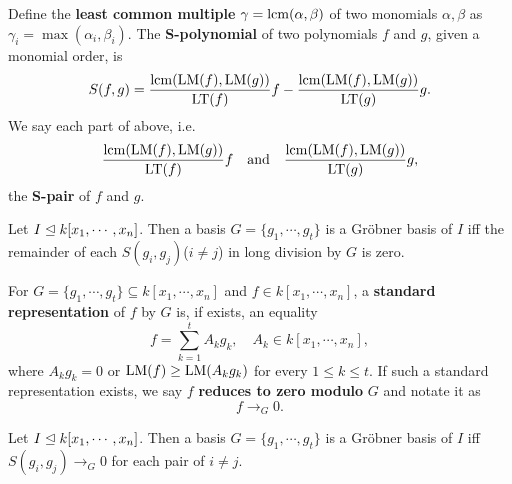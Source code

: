 \begin{definition}[S-polynomial]
    \label{def:SPolynomial}
    \leanok
    Define the \textbf{least common multiple} \(\gamma = \mathrm{lcm}(\alpha, \beta)\)
    of two monomials \(\alpha, \beta\) as \(\gamma_i = \max(\alpha_i, \beta_i)\).
    The \textbf{S-polynomial} of two polynomials \(f\) and \(g\), given a monomial order,
    is
    \[S(f, g) = \frac{\mathrm{lcm}(\mathrm{LM}(f), \mathrm{LM}(g))}{\mathrm{LT}(f)} f
              - \frac{\mathrm{lcm}(\mathrm{LM}(f), \mathrm{LM}(g))}{\mathrm{LT}(g)} g.\]
    We say each part of above, i.e.
    \[\frac{\mathrm{lcm}(\mathrm{LM}(f), \mathrm{LM}(g))}{\mathrm{LT}(f)} f \quad \textrm{and} \quad
      \frac{\mathrm{lcm}(\mathrm{LM}(f), \mathrm{LM}(g))}{\mathrm{LT}(g)} g,\]
    the \textbf{S-pair} of \(f\) and \(g\).
\end{definition}

\begin{theorem}
    \label{thm:BuchbergerCriterion}
    Let \(I \trianglelefteq k[x_1, \cdots, x_n]\). Then a basis \(G = \{g_1, \cdots, g_t\}\)
    is a Gr\"obner basis of \(I\) iff the remainder of each \(S(g_i, g_j)\)(\(i \ne j\))
    in long division by \(G\) is zero.
\end{theorem}

\begin{definition}
    \label{def:StandardRepresentation}
    \leanok
    For \(G = \{g_1, \cdots, g_t\} \subseteq k[x_1, \cdots, x_n]\) and \(f \in k[x_1, \cdots, x_n]\),
    a \textbf{standard representation} of \(f\) by \(G\) is, if exists, an equality
    \[f = \sum_{k=1}^t A_k g_k, \quad A_k \in k[x_1, \cdots, x_n],\]
    where \(A_k g_k = 0\) or \(\mathrm{LM}(f) \ge \mathrm{LM}(A_k g_k)\) for every \(1 \le k \le t\).
    If such a standard representation exists, we say \(f\) \textbf{reduces to zero modulo} \(G\)
    and notate it as
    \[f \to_G 0.\]
\end{definition}

\begin{theorem}
    \label{thm:RefinedBuchbergerCriterion}
    Let \(I \trianglelefteq k[x_1, \cdots, x_n]\). Then a basis \(G = \{g_1, \cdots, g_t\}\)
    is a Gr\"obner basis of \(I\) iff \(S(g_i, g_j) \to_G 0\) for each pair of \(i \ne j\).
\end{theorem}